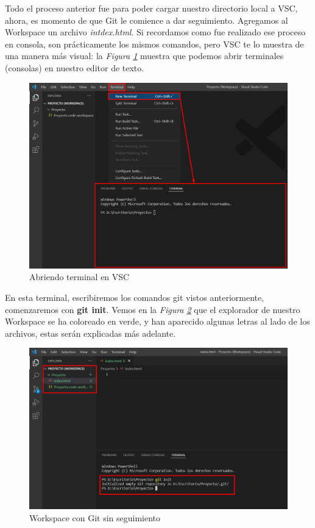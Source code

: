 Todo el proceso anterior fue para poder cargar nuestro directorio local a VSC, ahora, es momento de que Git le comience a dar seguimiento. Agregamos al Workspace un archivo \textit{intdex.html}. Si recordamos como fue realizado ese proceso en consola, son prácticamente los mismos comandos, pero VSC te lo muestra de una manera más visual: la \textit{Figura \ref{fig: 11}} muestra que podemos abrir terminales (consolas) en nuestro editor de texto.
\begin{figure}[H]
    \centering
    \caption{Abriendo terminal en VSC}
    \label{fig: 11}
    \includegraphics[width=12cm]{capturas/abriendo_terminal.png}
\end{figure}

En esta terminal, escribiremos los comandos git vistos anteriormente, comenzaremos con \textbf{git init}. Vemos en la \textit{Figura \ref{fig: 12}} que el explorador de nuestro Workspace se ha coloreado en verde, y han aparecido algunas letras al lado de los archivos, estas serán explicadas más adelante.
\begin{figure}[H]
    \centering
    \caption{Workspace con Git sin seguimiento}
    \label{fig: 12}
    \includegraphics[width=12cm]{capturas/git init.png}
\end{figure}

